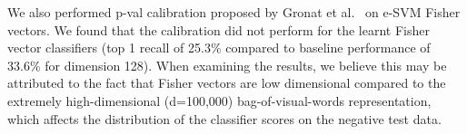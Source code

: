 \documentclass[10pt,twocolumn,letterpaper]{article}
\begin{document}
        \textcolor{petr}{
         We also performed p-val calibration proposed by Gronat et al.~\cite{Gronat13} on e-SVM Fisher vectors. We found that the calibration did not perform for the learnt Fisher vector classifiers (top 1 recall of 25.3\% compared to baseline performance of 33.6\% for dimension 128). When examining the results, we believe this may be attributed to the fact that Fisher vectors are low dimensional compared to the extremely high-dimensional (d=100,000) bag-of-visual-words representation, which affects the distribution of the classifier scores on the negative test data. 
        }
\end{document}
